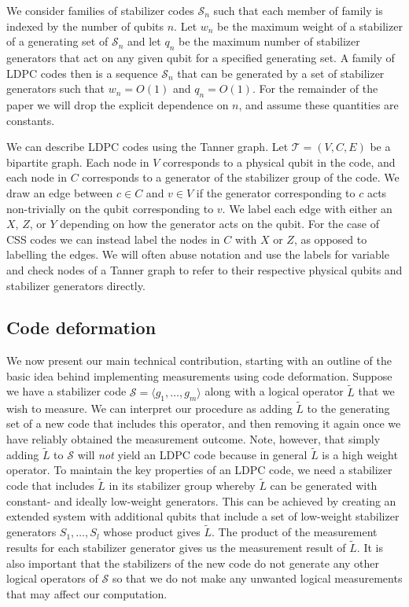 \documentclass[reprint,
superscriptaddress,
 amsmath,amssymb,
 aps, longbibliography
]{revtex4-1}
\begin{document}
We consider families of stabilizer codes $\mathcal{S}_n$ such that each member of family is indexed by the number of qubits $n$.  Let $w_n$ be the maximum weight of a stabilizer of a generating set of $\mathcal{S}_n$ and let $q_n$ be the maximum number of stabilizer generators that act on any given qubit for a specified generating set. A family of LDPC codes then is a sequence $\mathcal{S}_n$ that can be generated by a set of stabilizer generators such that $w_n = O(1)$ and $q_n = O(1)$. For the remainder of the paper we will drop the explicit dependence on $n$, and assume these quantities are constants.

We can describe LDPC codes using the Tanner graph. Let $\mathcal{T} = (V, C, E)$ be a bipartite graph. Each node in $V$ corresponds to a physical qubit in the code, and each node in $C$ corresponds to a generator of the stabilizer group of the code. We draw an edge between $c \in C$ and $v \in V$ if the generator corresponding to $c$ acts non-trivially on the qubit corresponding to $v$. We label each edge with either an $X$, $Z$, or $Y$ depending on how the generator acts on the qubit. For the case of CSS codes we can instead label the nodes in $C$ with $X$ or $Z$, as opposed to labelling the edges. We will often abuse notation and use the labels for variable and check nodes of a Tanner graph to refer to their respective physical qubits and stabilizer generators directly.

\subsection{\label{sec:deformation}Code deformation}

We now present our main technical contribution, starting with an outline of the basic idea behind implementing measurements using code deformation. Suppose we have a stabilizer code $\mathcal{S} = \langle g_1, \ldots, g_m \rangle $ along with a logical operator $\tilde{L}$ that we wish to measure. We can interpret our procedure as adding $\tilde{L}$ to the generating set of a new code that includes this operator, and then removing it again once we have reliably obtained the measurement outcome. Note, however, that simply adding $\tilde{L}$ to $\mathcal{S}$ will \emph{not} yield an LDPC code because in general $\tilde{L}$ is a high weight operator. To maintain the key properties of an LDPC code, we need a stabilizer code that includes $\tilde{L}$ in its stabilizer group whereby $\tilde{L}$ can be generated with constant- and ideally low-weight generators. This can be achieved by creating an extended system with additional qubits that include a set of low-weight stabilizer generators $S_1, \ldots, S_l$ whose product gives $\tilde{L}$. The product of the measurement results for each stabilizer generator gives us the measurement result of $\tilde{L}$. It is also important that the stabilizers of the new code do not generate any other logical operators of $\mathcal{S}$ so that we do not make any unwanted logical measurements that may affect our computation.
\end{document}
